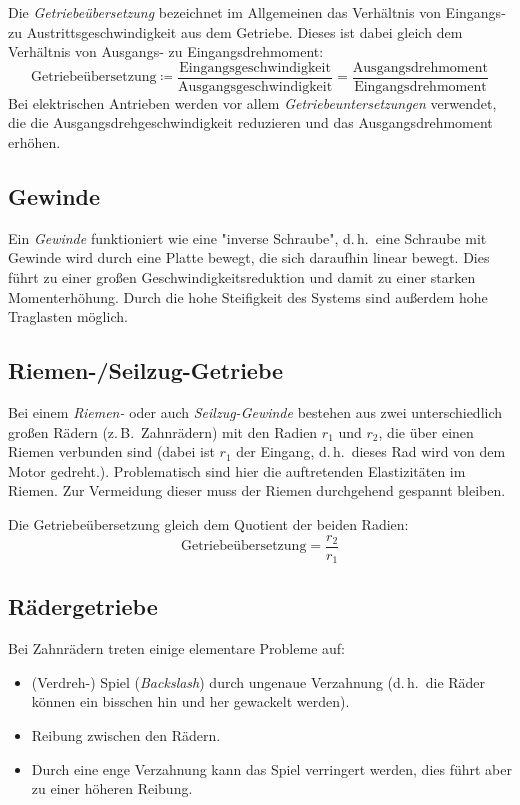 \documentclass[a4paper, 11pt, accentcolor = tud3b]{tudreport}
\renewcommand{\dh}{d.\,h.~}
\newcommand{\zB}{z.\,B.~}
\begin{document}
			Die \emph{Getriebeübersetzung} bezeichnet im Allgemeinen das Verhältnis von Eingangs- zu Austrittsgeschwindigkeit aus dem Getriebe. Dieses ist dabei gleich dem Verhältnis von Ausgangs- zu Eingangsdrehmoment:
			\begin{equation*}
				\text{Getriebeübersetzung} \coloneqq \frac{\text{Eingangsgeschwindigkeit}}{\text{Ausgangsgeschwindigkeit}} = \frac{\text{Ausgangsdrehmoment}}{\text{Eingangsdrehmoment}}
			\end{equation*}
			Bei elektrischen Antrieben werden vor allem \emph{Getriebeuntersetzungen} verwendet, die die Ausgangsdrehgeschwindigkeit reduzieren und das Ausgangsdrehmoment erhöhen.

			\subsection{Gewinde}
				Ein \emph{Gewinde} funktioniert wie eine "inverse Schraube", \dh eine Schraube mit Gewinde wird durch eine Platte bewegt, die sich daraufhin linear bewegt. Dies führt zu einer großen Geschwindigkeitsreduktion und damit zu einer starken Momenterhöhung. Durch die hohe Steifigkeit des Systems sind außerdem hohe Traglasten möglich.

			\subsection{Riemen-/Seilzug-Getriebe}
				Bei einem \emph{Riemen-} oder auch \emph{Seilzug-Gewinde} bestehen aus zwei unterschiedlich großen Rädern (\zB Zahnrädern) mit den Radien \(r_1\) und \(r_2\), die über einen Riemen verbunden sind (dabei ist \(r_1\) der Eingang, \dh dieses Rad wird von dem Motor gedreht.). Problematisch sind hier die auftretenden Elastizitäten im Riemen. Zur Vermeidung dieser muss der Riemen durchgehend gespannt bleiben.
				
				Die Getriebeübersetzung gleich dem Quotient der beiden Radien:
				\begin{equation*}
					\text{Getriebeübersetzung} = \frac{r_2}{r_1}
				\end{equation*}

			\subsection{Rädergetriebe}
				Bei Zahnrädern treten einige elementare Probleme auf:
				\begin{itemize}
					\item (Verdreh-) Spiel (\emph{Backslash}) durch ungenaue Verzahnung (\dh die Räder können ein bisschen hin und her gewackelt werden).
					\item Reibung zwischen den Rädern.
					\item Durch eine enge Verzahnung kann das Spiel verringert werden, dies führt aber zu einer höheren Reibung.
				\end{itemize}
			
\end{document}
